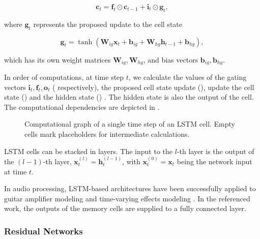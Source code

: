 \begin{equation}
  \pmb{c}_t = \pmb{f}_t \odot \pmb{c}_{t-1} + \pmb{i}_t \odot \pmb{g}_t,
  \label{eq:lstm_cell_update}
\end{equation}

where $\pmb{g}_t$ represents the proposed update to the cell state

\begin{equation}
  \pmb{g}_t = \tanh (\pmb{W}_{ig} \pmb{x}_t + \pmb{b}_{ig} + \pmb{W}_{hg} \pmb{h}_{t-1} + \pmb{b}_{hg}),
  \label{eq:lstm_proposed_update}
\end{equation}

which has its own weight matrices $\pmb{W}_{ig}, \pmb{W}_{hg}$, and bias vectors $\pmb{b}_{ig}, \pmb{b}_{hg}$.

In order of computations, at time step $t$, we calculate the values of the gating vectors $\pmb{i}_t, \pmb{f}_t, \pmb{o}_t$ ( respectively), the proposed cell state update (), update the cell state () and the hidden state () \cite{Pytorch}. The hidden state is also the output of the cell. The computational dependencies are depicted in .

\begin{figure}
  \centering
  \def\svgwidth{\columnwidth}
  
  \caption{Computational graph of a single time step of an \ac{LSTM} cell. Empty cells mark placeholders for intermediate calculations.}
  \label{fig:lstm_memory_cell}
\end{figure}

\ac{LSTM} cells can be stacked in layers. The input to the $l$-th layer is the output of the $(l-1)$-th layer, $\pmb{x}_t^{(l)} = \pmb{h}_t^{(l-1)}$, with $\pmb{x}_t^{(0)} = \pmb{x}_t$ being the network input at time $t$.

In audio processing, \ac{LSTM}-based architectures have been successfully applied to guitar amplifier modeling \cite{Wright2019,Wrightetal2020} and time-varying effects modeling \cite{Wright2020}. In the referenced work, the outputs of the memory cells are supplied to a fully connected layer.

\subsubsection{Residual Networks}

